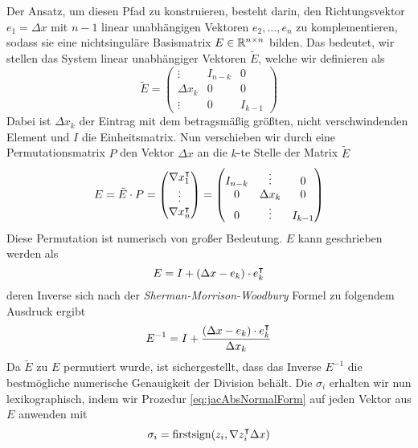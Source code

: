 Der Ansatz, um diesen Pfad zu konstruieren, besteht darin, den Richtungsvektor $e_1 = \Delta x$ mit $n-1$ linear unabhängigen Vektoren $e_2,\ldots, e_n$ zu komplementieren, sodass sie eine nichtsinguläre Basismatrix $E\in \mathbb{R}^{n\times n}$ bilden.
Das bedeutet, wir stellen das System linear unabhängiger Vektoren $\tilde E$, welche wir definieren als
\[
\tilde E = 
 \begin{pmatrix}
  \vdots   & I_{n-k} & 0 \\
  \Delta x_k & 0&0\\
  \vdots   & 0&I_{k-1}
 \end{pmatrix}
\]
Dabei ist $\Delta x_k$ der Eintrag mit dem betragsmäßig größten, nicht verschwindenden Element und $I$ die Einheitsmatrix. Nun verschieben wir durch eine Permutationsmatrix $P$ den Vektor $\Delta x$ an die $k$-te Stelle der Matrix $\tilde E$
\[
E = \tilde E \cdot P=
\begin{pmatrix}
  \nabla x_1^\intercal\\
  \vdots\\
  \nabla x_n^\intercal\\
 \end{pmatrix}
 =
  \begin{pmatrix}
   I_{n-k} & \vdots &0\\
  0 & \Delta x_k & 0\\
    0 & \vdots&I_{k-1}
 \end{pmatrix}
\]
Diese Permutation ist numerisch von großer Bedeutung. $E$ kann geschrieben werden als
\[
  E = I + (\Delta x-e_k)\cdot e_k^\intercal 
\] 
deren Inverse sich nach der \textit{Sherman-Morrison-Woodbury} Formel zu folgendem Ausdruck ergibt 
\[
 E^{-1} = I + \frac{(\Delta x-e_k)\cdot e_k^\intercal}{\Delta x_k}
\]
Da $\tilde E$ zu $E$ permutiert wurde, ist sichergestellt, dass das Inverse $E^{-1}$ die bestmögliche numerische Genauigkeit der Division behält.
Die $\sigma_i$ erhalten wir nun lexikographisch, indem wir Prozedur \eqref{eq:jacAbsNormalForm} auf jeden Vektor aus $E$ anwenden mit 
\[
  \sigma_i = \text{firstsign}(z_i,\nabla z_i^\intercal\Delta x)
\]

